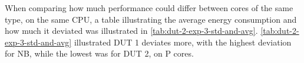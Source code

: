 When comparing how much performance could differ between cores of the same type, on the same CPU, a table illustrating the average energy consumption and how much it deviated was illustrated in \cref{tab:dut-2-exp-3-std-and-avg}. \cref{tab:dut-2-exp-3-std-and-avg} illustrated DUT 1 deviates more, with the highest deviation for NB, while the lowest was for DUT 2, on P cores.









